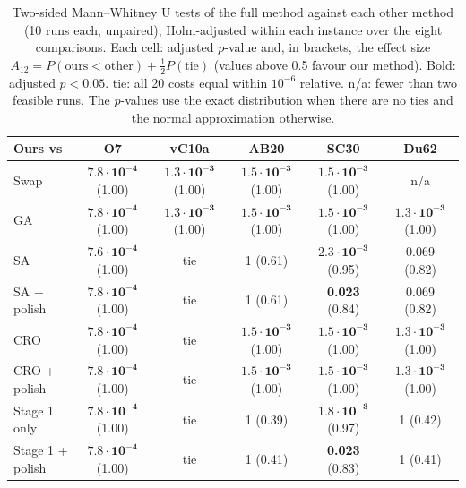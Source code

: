 \begin{table}[tbp]
\centering
\caption{Two-sided Mann--Whitney U tests of the full method against each other method (10 runs each, unpaired),
Holm-adjusted within each instance over the eight comparisons. Each cell: adjusted $p$-value and, in brackets,
the effect size $A_{12}=P(\text{ours}<\text{other})+\tfrac12P(\text{tie})$ (values above 0.5 favour our method).
Bold: adjusted $p<0.05$. tie: all 20 costs equal within $10^{-6}$ relative. n/a: fewer than two feasible runs.
The $p$-values use the exact distribution when there are no ties and the normal approximation otherwise.}
\label{tab:bx-stats}
\footnotesize
\setlength{\tabcolsep}{4pt}
\begin{tabular}{lccccc}
\toprule
Ours vs & O7 & vC10a & AB20 & SC30 & Du62\\
\midrule
Swap & $\mathbf{7.8\cdot10^{-4}}$ (1.00) & $\mathbf{1.3\cdot10^{-3}}$ (1.00) & $\mathbf{1.5\cdot10^{-3}}$ (1.00) & $\mathbf{1.5\cdot10^{-3}}$ (1.00) & n/a \\
GA & $\mathbf{7.8\cdot10^{-4}}$ (1.00) & $\mathbf{1.3\cdot10^{-3}}$ (1.00) & $\mathbf{1.5\cdot10^{-3}}$ (1.00) & $\mathbf{1.5\cdot10^{-3}}$ (1.00) & $\mathbf{1.3\cdot10^{-3}}$ (1.00) \\
SA & $\mathbf{7.6\cdot10^{-4}}$ (1.00) & tie & 1 (0.61) & $\mathbf{2.3\cdot10^{-3}}$ (0.95) & 0.069 (0.82) \\
SA + polish & $\mathbf{7.8\cdot10^{-4}}$ (1.00) & tie & 1 (0.61) & \textbf{0.023} (0.84) & 0.069 (0.82) \\
CRO & $\mathbf{7.8\cdot10^{-4}}$ (1.00) & tie & $\mathbf{1.5\cdot10^{-3}}$ (1.00) & $\mathbf{1.5\cdot10^{-3}}$ (1.00) & $\mathbf{1.3\cdot10^{-3}}$ (1.00) \\
CRO + polish & $\mathbf{7.8\cdot10^{-4}}$ (1.00) & tie & $\mathbf{1.5\cdot10^{-3}}$ (1.00) & $\mathbf{1.5\cdot10^{-3}}$ (1.00) & $\mathbf{1.3\cdot10^{-3}}$ (1.00) \\
\midrule
Stage 1 only & $\mathbf{7.8\cdot10^{-4}}$ (1.00) & tie & 1 (0.39) & $\mathbf{1.8\cdot10^{-3}}$ (0.97) & 1 (0.42) \\
Stage 1 + polish & $\mathbf{7.8\cdot10^{-4}}$ (1.00) & tie & 1 (0.41) & \textbf{0.023} (0.83) & 1 (0.41) \\
\bottomrule
\end{tabular}
\end{table}
